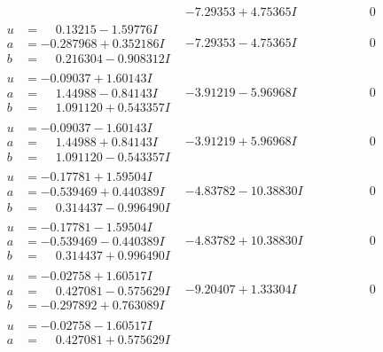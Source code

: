 \documentclass[1p]{elsarticle_modified}
\theoremstyle{definition}
\begin{document}
$$\begin{array}{c|c|c}
 & -7.29353 + 4.75365 I & \phantom{-0.000000 } 0 \\ \hline\begin{aligned}
u &= \phantom{-}0.13215 - 1.59776 I \\
a &= -0.287968 + 0.352186 I \\
b &= \phantom{-}0.216304 - 0.908312 I\end{aligned}
 & -7.29353 - 4.75365 I & \phantom{-0.000000 } 0 \\ \hline\begin{aligned}
u &= -0.09037 + 1.60143 I \\
a &= \phantom{-}1.44988 - 0.84143 I \\
b &= \phantom{-}1.091120 + 0.543357 I\end{aligned}
 & -3.91219 - 5.96968 I & \phantom{-0.000000 } 0 \\ \hline\begin{aligned}
u &= -0.09037 - 1.60143 I \\
a &= \phantom{-}1.44988 + 0.84143 I \\
b &= \phantom{-}1.091120 - 0.543357 I\end{aligned}
 & -3.91219 + 5.96968 I & \phantom{-0.000000 } 0 \\ \hline\begin{aligned}
u &= -0.17781 + 1.59504 I \\
a &= -0.539469 + 0.440389 I \\
b &= \phantom{-}0.314437 - 0.996490 I\end{aligned}
 & -4.83782 - 10.38830 I & \phantom{-0.000000 } 0 \\ \hline\begin{aligned}
u &= -0.17781 - 1.59504 I \\
a &= -0.539469 - 0.440389 I \\
b &= \phantom{-}0.314437 + 0.996490 I\end{aligned}
 & -4.83782 + 10.38830 I & \phantom{-0.000000 } 0 \\ \hline\begin{aligned}
u &= -0.02758 + 1.60517 I \\
a &= \phantom{-}0.427081 - 0.575629 I \\
b &= -0.297892 + 0.763089 I\end{aligned}
 & -9.20407 + 1.33304 I & \phantom{-0.000000 } 0 \\ \hline\begin{aligned}
u &= -0.02758 - 1.60517 I \\
a &= \phantom{-}0.427081 + 0.575629 I \\

\end{aligned}
\end{array}$$
\end{document}
